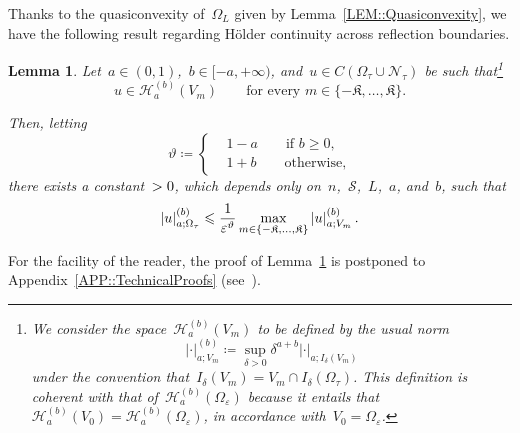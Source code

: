 \documentclass[12pt,a4paper]{amsart}
\makeatletter
\numberwithin{equation}{section}
\newtheorem{lemma}[theorem]{Lemma}
\theoremstyle{definition}
\theoremstyle{remark}
\newcommand{\eps}{\varepsilon}
\newcommand{\abs}[1]{\left\lvert#1\right\rvert}
\renewcommand{\leq}{\leqslant}
\renewcommand{\geq}{\geqslant}
\newcommand{\const}[1]{%
  \csname const@#1\endcsname%
}
\makeatother
\begin{document}
Thanks to the quasiconvexity of~$\Omega_L$ given by Lemma~\ref{LEM::Quasiconvexity}, we have the following result regarding Hölder continuity across reflection boundaries.

\begin{lemma}\label{LEM::PiecewiseRegularityToGlobal}
    Let~$a \in (0,1)$,~$b\in [-a,+\infty)$, and~$u \in C(\Omega_\tau \cup \mathcal{N}_\tau)$ be such that\footnote{We consider the space~$\mathcal{H}_a^{(b)}(V_m)$ to be defined by the usual norm %
    \[\abs{\cdot}_{a; V_m}^{(b)} \coloneq \sup_{\delta > 0} \delta^{a+b} \abs{\cdot}_{a; I_\delta(V_m)}\]
    under the convention that~$I_\delta(V_m) = V_m \cap I_\delta(\Omega_\tau)$. This definition is coherent with that of~$\mathcal{H}_a^{(b)}(\Omega_\eps)$ because it entails that~$\mathcal{H}_a^{(b)}(V_0) = \mathcal{H}_a^{(b)}(\Omega_\eps)$, in accordance with~$V_0 = \Omega_\eps$.}
    \begin{equation}
        u \in \mathcal{H}_a^{(b)}(V_m)\qquad \text{for every }m \in \{-\mathfrak{K},\dots,\mathfrak{K}\}.
    \end{equation}
    
    Then, letting
    \begin{equation}\label{EQ::ThetaExponentDefinition}
        \vartheta \coloneq \left\{\begin{aligned}
            &1-a\qquad\text{if }b\geq 0,\\
            &1+b\qquad\text{otherwise,}
        \end{aligned}\right.
    \end{equation}
    there exists a constant~$\const{CONST::PiecewiseRegularityToGlobal}>0$, which depends only on~$n$,~$\mathcal{S}$,~$L$,~$a$, and~$b$, such that
    \begin{equation}\label{EQ::PiecewiseRegularityToGlobal}
        \abs{u}_{a; \Omega_\tau}^{(b)} \leq \const{CONST::PiecewiseRegularityToGlobal} \frac{1}{\eps^{\vartheta}} \max_{m \in \{-\mathfrak{K},\dots,\mathfrak{K}\}} \abs{u}_{a; V_m}^{(b)}.
    \end{equation}
\end{lemma}

For the facility of the reader, the proof of Lemma~\ref{LEM::PiecewiseRegularityToGlobal} is postponed to Appendix~\ref{APP::TechnicalProofs} (see~).
\end{document}
